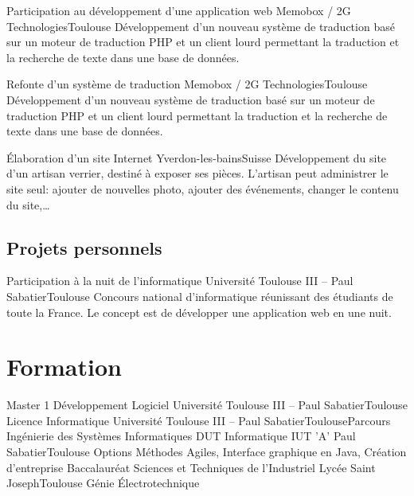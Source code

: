 \documentclass{my_cv_bis}
\begin{document}
	{ Participation au développement d'une application web}
	{Memobox / 2G Technologies}{Toulouse}
	{Développement d'un nouveau système de traduction basé sur un moteur de traduction PHP et un client lourd
	permettant la traduction et la recherche de texte dans une base de données.  } {}

	{ Refonte d’un système de traduction }
	{Memobox / 2G Technologies}{Toulouse}
	{Développement d'un nouveau système de traduction basé sur un moteur de traduction PHP et un client lourd
	permettant la traduction et la recherche de texte dans une base de données.  } {}

	{Élaboration d’un site Internet}
	{Yverdon-les-bains}{Suisse}
	{Développement du site d’un artisan verrier, destiné à exposer ses pièces. L'artisan peut administrer le site
	seul: ajouter de nouvelles photo, ajouter des événements, changer le contenu du site,\ldots}
	{}

	\subsection{Projets personnels}
	{Participation à la nuit de l'informatique}
	{Université Toulouse III -- Paul Sabatier}{Toulouse}
	{ Concours national d’informatique réunissant des étudiants de toute la France. Le concept est de développer une application web en une nuit.} 
	{}
	\vspace{-20px}
\section{Formation}
\hspace{0px}
	{Master 1 Développement Logiciel}
	{Université Toulouse III -- Paul Sabatier}{Toulouse}{}{}
	{Licence Informatique}
	{Université Toulouse III -- Paul Sabatier}{Toulouse}{Parcours Ingénierie des Systèmes Informatiques}{}
	{DUT Informatique}
	{IUT 'A' Paul Sabatier}{Toulouse}
	{Options Méthodes Agiles, Interface graphique en Java, Création d'entreprise}
	{}
	\hspace{0px}	
	{Baccalauréat Sciences et Techniques de l'Industriel}
	{Lycée Saint Joseph}{Toulouse}
	{Génie Électrotechnique}{}
	\vspace{-20px}
\end{document}
